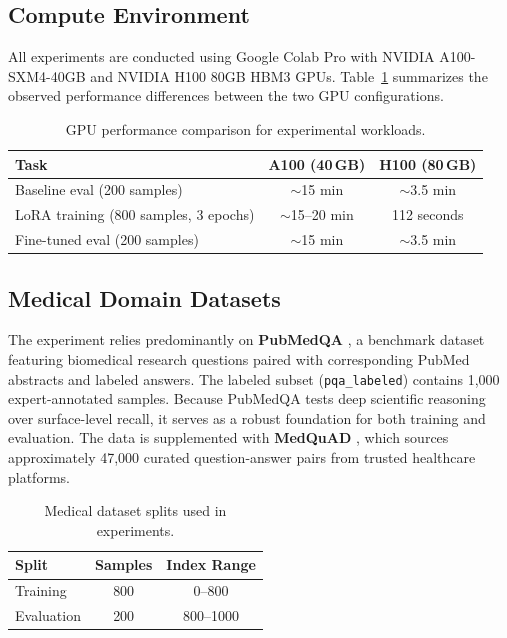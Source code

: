 \documentclass[12pt, letterpaper]{article}
\begin{document}
\subsection{Compute Environment}

All experiments are conducted using Google Colab Pro with NVIDIA A100-SXM4-40GB and NVIDIA H100 80GB HBM3 GPUs. Table~\ref{tab:gpu-comparison} summarizes the observed performance differences between the two GPU configurations.

\begin{table}[H]
\centering
\caption{GPU performance comparison for experimental workloads.}
\label{tab:gpu-comparison}
\begin{tabular}{lcc}
\toprule
\textbf{Task}                         & \textbf{A100 (40\,GB)} & \textbf{H100 (80\,GB)} \\
\midrule
Baseline eval (200 samples)           & $\sim$15 min           & $\sim$3.5 min \\
LoRA training (800 samples, 3 epochs) & $\sim$15--20 min       & 112 seconds \\
Fine-tuned eval (200 samples)         & $\sim$15 min           & $\sim$3.5 min \\
\bottomrule
\end{tabular}
\end{table}

\subsection{Medical Domain Datasets}

The experiment relies predominantly on \textbf{PubMedQA} \citep{jin2019pubmedqa}, a benchmark dataset featuring biomedical research questions paired with corresponding PubMed abstracts and labeled answers. The labeled subset (\texttt{pqa\_labeled}) contains 1,000 expert-annotated samples. Because PubMedQA tests deep scientific reasoning over surface-level recall, it serves as a robust foundation for both training and evaluation. The data is supplemented with \textbf{MedQuAD} \citep{abacha2019medquad}, which sources approximately 47,000 curated question-answer pairs from trusted healthcare platforms.

\begin{table}[H]
\centering
\caption{Medical dataset splits used in experiments.}
\label{tab:medical-data}
\begin{tabular}{lcc}
\toprule
\textbf{Split}    & \textbf{Samples} & \textbf{Index Range} \\
\midrule
Training          & 800              & 0--800 \\
Evaluation        & 200              & 800--1000 \\
\bottomrule
\end{tabular}
\end{table}
\end{document}
